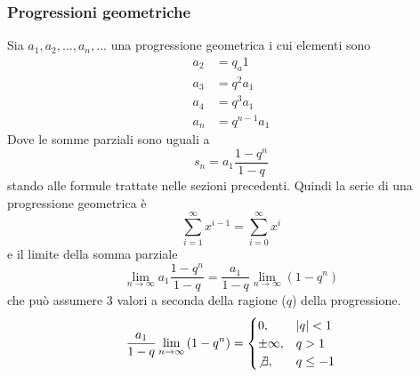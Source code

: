 \subsubsection{Progressioni geometriche}
Sia $a_1,a_2,\ldots,a_n,\ldots$ una progressione geometrica i cui elementi sono
\begin{align*}
  a_2&=q_a1\\
  a_3&=q^2a_1\\
  a_4&=q^3a_1\\
  a_n&=q^{n-1}a_1
\end{align*}
Dove le somme parziali sono uguali a 
\begin{equation*}
  s_n = a_1 \frac{1-q^n}{1-q}
\end{equation*}
stando alle formule trattate nelle sezioni precedenti. Quindi la serie di una progressione
geometrica è
\begin{equation*}
  \sum\limits^{\infty}_{i=1} x^{i-1}=\sum\limits^{\infty}_{i=0} x^i
\end{equation*}
e il limite della somma parziale
\begin{equation*}
  \lim\limits_{n \to \infty} a_1 \frac{1-q^n}{1-q}=
  \frac{a_1}{1-q}\lim\limits_{n \to \infty} \left( 1-q^n \right)
\end{equation*}
che può assumere 3 valori a seconda della ragione ($q$) della progressione.
\begin{equation*}
  \frac{a_1}{1-q}\lim\limits_{n \to \infty} \left( 1-q^n \right) =
  \begin{cases}
    0, &\lvert q\rvert<1\\
    \pm\infty, &q>1\\
    \not\exists, &q\leq-1
  \end{cases}
\end{equation*}
